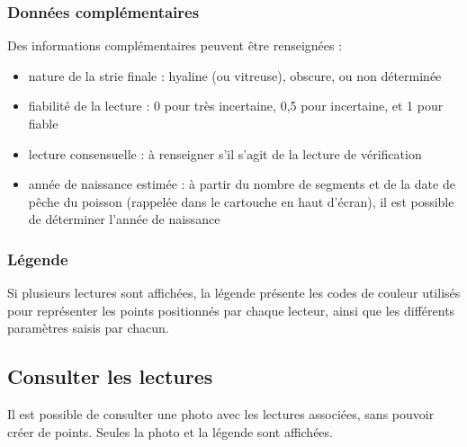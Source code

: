\subsubsection{Données complémentaires}
Des informations complémentaires peuvent être renseignées :
\begin{itemize}
\item nature de la strie finale : hyaline (ou vitreuse), obscure, ou non déterminée
\item fiabilité de la lecture : 0 pour très incertaine, 0,5 pour incertaine, et 1 pour fiable
\item lecture consensuelle : à renseigner s'il s'agit de la lecture de vérification
\item année de naissance estimée : à partir du nombre de segments et de la date de pêche du poisson (rappelée dans le cartouche en haut d'écran), il est possible de déterminer l'année de naissance
\end{itemize}

\subsubsection{Légende}

Si plusieurs lectures sont affichées, la légende présente les codes de couleur utilisés pour représenter les points positionnés par chaque lecteur, ainsi que les différents paramètres saisis par chacun.

\subsection{Consulter les lectures}

Il est possible de consulter une photo avec les lectures associées, sans pouvoir créer de points. Seules la photo et la légende sont affichées.